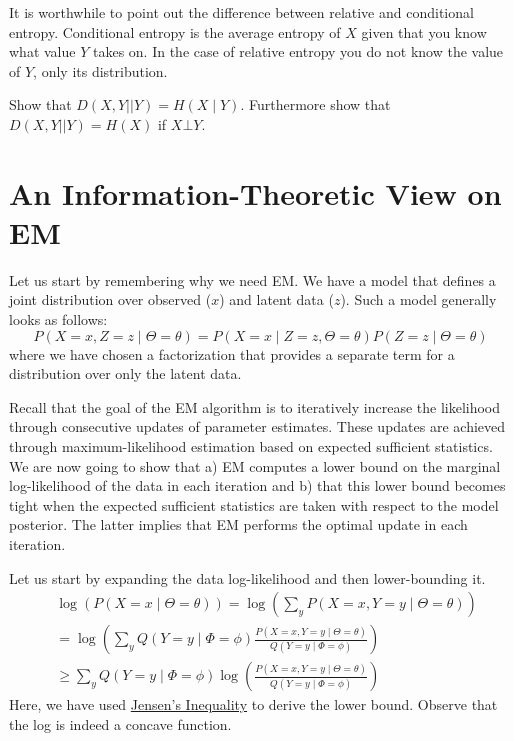 It is worthwhile to point out the difference between relative and conditional entropy. Conditional entropy is the average entropy of $ X $ given that you
know what value $ Y $ takes on. In the case of relative entropy you do not know the value of $ Y $, only its distribution.

\begin{Exercise}
Show that $ D(X,Y||Y) = H(X \mid Y) $. Furthermore show that $ D(X,Y||Y) = H(X) $ if $ X\bot Y $.
\end{Exercise}


\section{An Information-Theoretic View on EM}

Let us start by remembering why we need EM. We have a model that defines a joint distribution
over observed ($ x $) and latent data ($ z $). Such a model generally looks as follows:
\begin{equation}
P(X=x, Z=z  \mid  \Theta = \theta) = P(X=x \mid Z=z, \Theta=\theta) P(Z=z \mid \Theta = \theta)
\end{equation}
where we have chosen a factorization that provides a separate term for a distribution over only the
latent data.

Recall that the goal of the EM algorithm is to iteratively increase the likelihood through consecutive
updates of parameter estimates. These updates are achieved through maximum-likelihood estimation based
on expected sufficient statistics. We are now going to show that a) EM computes a lower bound on the
marginal log-likelihood of the data in each iteration and b) that this lower bound becomes tight when the
expected sufficient statistics are taken with respect to the model posterior. The latter implies that
EM performs the optimal update in each iteration.

Let us start by expanding the data log-likelihood and then lower-bounding it.
\begin{align}
&\log(P(X=x \mid \Theta=\theta)) = \log(\sum_y P(X=x, Y=y \mid  \Theta = \theta))  \\
&= \log\left(\sum_{y} Q(Y=y \mid \Phi=\phi)\frac{P(X=x, Y=y \mid  \Theta = \theta)}{Q(Y=y \mid \Phi=\phi)}\right) \\
&\geq \sum_{y} Q(Y=y \mid \Phi=\phi) \log\left(\frac{P(X=x, Y=y \mid  \Theta = \theta)}{Q(Y=y \mid \Phi=\phi)}\right)
\label{eq:ELBO1}
\end{align}
Here, we have used \href{https://en.wikipedia.org/wiki/Jensen\%27s_inequality}{Jensen's Inequality} to
derive the lower bound. Observe that the log is indeed a concave function. 

